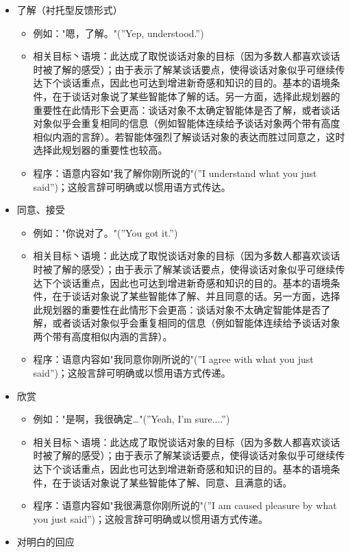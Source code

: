 \begin{itemize}
\item 了解（衬托型反馈形式）
\begin{itemize}
\item 例如："嗯，了解。"(”Yep, understood.”)
\item 相关目标丶语境：此达成了取悦谈话对象的目标（因为多数人都喜欢谈话时被了解的感受）；由于表示了解某谈话要点，使得谈话对象似乎可继续传达下个谈话重点，因此也可达到增进新奇感和知识的目的。基本的语境条件，在于谈话对象说了某些智能体了解的话。另一方面，选择此规划器的重要性在此情形下会更高：谈话对象不太确定智能体是否了解，或者谈话对象似乎会重复相同的信息（例如智能体连续给予谈话对象两个带有高度相似内涵的言辞）。若智能体强烈了解谈话对象的表达而胜过同意之，这时选择此规划器的重要性也较高。
\item 程序：语意内容如"我了解你刚所说的"(”I understand what you just said”)；这般言辞可明确或以惯用语方式传达。
\end{itemize}
\item 同意、接受
\begin{itemize}
\item 例如："你说对了。"(”You got it.”)
\item 相关目标丶语境：此达成了取悦谈话对象的目标（因为多数人都喜欢谈话时被了解的感受）；由于表示了解某谈话要点，使得谈话对象似乎可继续传达下个谈话重点，因此也可达到增进新奇感和知识的目的。基本的语境条件，在于谈话对象说了某些智能体了解、并且同意的话。另一方面，选择此规划器的重要性在此情形下会更高：谈话对象不太确定智能体是否了解，或者谈话对象似乎会重复相同的信息（例如智能体连续给予谈话对象两个带有高度相似内涵的言辞）。 
\item 程序：语意内容如"我同意你刚所说的"(”I agree with what you just said”)；这般言辞可明确或以惯用语方式传递。
\end{itemize}
\item 欣赏
\begin{itemize}
\item 例如："是啊，我很确定…"(”Yeah, I’m sure....”)
\item 相关目标丶语境：此达成了取悦谈话对象的目标（因为多数人都喜欢谈话时被了解的感受）；由于表示了解某谈话要点，使得谈话对象似乎可继续传达下个谈话重点，因此也可达到增进新奇感和知识的目的。基本的语境条件，在于谈话对象说了某些智能体了解、同意、且满意的话。 
\item 程序：语意内容如"我很满意你刚所说的"(”I am caused pleasure by what you just said”)；这般言辞可明确或以惯用语方式传递。
\end{itemize}
\item 对明白的回应

\end{itemize}
